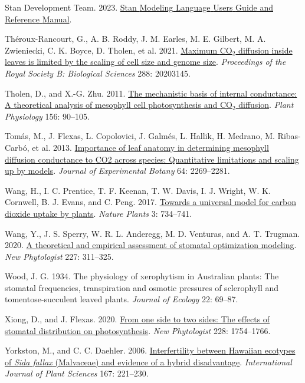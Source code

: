 \documentclass[
  letterpaper,
  DIV=11,
  numbers=noendperiod]{scrartcl}
\newlength{\cslhangindent}
\newlength{\cslentryspacingunit} %
\newenvironment{CSLReferences}[2] %
 {%
  \setlength{\parindent}{0pt}
  \ifodd #1
  \let\oldpar\par
  \def\par{\hangindent=\cslhangindent\oldpar}
  \fi
  \setlength{\parskip}{#2\cslentryspacingunit}
 }%
 {}
\begin{document}
\begin{CSLReferences}{1}{0}
\leavevmode{}%
Stan Development Team. 2023. \href{https://mc-stan.org}{Stan {Modeling}
{Language} {Users} {Guide} and {Reference} {Manual}}.

\leavevmode{}%
Théroux-Rancourt, G., A. B. Roddy, J. M. Earles, M. E. Gilbert, M. A.
Zwieniecki, C. K. Boyce, D. Tholen, et al. 2021.
\href{https://doi.org/10.1098/rspb.2020.3145}{Maximum
{CO}\(_{\textrm{2}}\) diffusion inside leaves is limited by the scaling
of cell size and genome size}. \emph{Proceedings of the Royal Society B:
Biological Sciences} 288: 20203145.

\leavevmode{}%
Tholen, D., and X.-G. Zhu. 2011.
\href{https://doi.org/10.1104/pp.111.172346}{The mechanistic basis of
internal conductance: {A} theoretical analysis of mesophyll cell
photosynthesis and {CO}\(_{\textrm{2}}\) diffusion}. \emph{Plant
Physiology} 156: 90--105.

\leavevmode{}%
Tomás, M., J. Flexas, L. Copolovici, J. Galmés, L. Hallik, H. Medrano,
M. Ribas-Carbó, et al. 2013.
\href{https://doi.org/10.1093/jxb/ert086}{Importance of leaf anatomy in
determining mesophyll diffusion conductance to {CO2} across species:
Quantitative limitations and scaling up by models}. \emph{Journal of
Experimental Botany} 64: 2269--2281.

\leavevmode{}%
Wang, H., I. C. Prentice, T. F. Keenan, T. W. Davis, I. J. Wright, W. K.
Cornwell, B. J. Evans, and C. Peng. 2017.
\href{https://doi.org/10.1038/s41477-017-0006-8}{Towards a universal
model for carbon dioxide uptake by plants}. \emph{Nature Plants} 3:
734--741.

\leavevmode{}%
Wang, Y., J. S. Sperry, W. R. L. Anderegg, M. D. Venturas, and A. T.
Trugman. 2020. \href{https://doi.org/10.1111/nph.16572}{A theoretical
and empirical assessment of stomatal optimization modeling}. \emph{New
Phytologist} 227: 311--325.

\leavevmode{}%
Wood, J. G. 1934. The physiology of xerophytism in {Australian} plants:
The stomatal frequencies, transpiration and osmotic pressures of
sclerophyll and tomentose-succulent leaved plants. \emph{Journal of
Ecology} 22: 69--87.

\leavevmode{}%
Xiong, D., and J. Flexas. 2020.
\href{https://doi.org/10.1111/nph.16801}{From one side to two sides: The
effects of stomatal distribution on photosynthesis}. \emph{New
Phytologist} 228: 1754--1766.

\leavevmode{}%
Yorkston, M., and C. C. Daehler. 2006.
\href{https://doi.org/10.1086/499615}{Interfertility between {Hawaiian}
ecotypes of \emph{{Sida} fallax} ({Malvaceae}) and evidence of a hybrid
disadvantage}. \emph{International Journal of Plant Sciences} 167:
221--230.

\end{CSLReferences}
\end{document}
